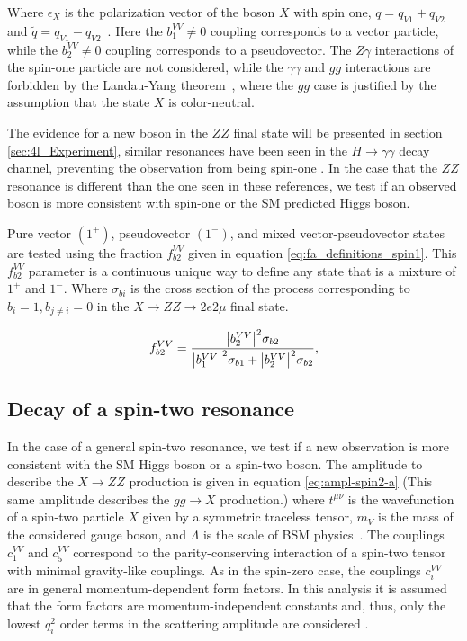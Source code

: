 Where $\epsilon_{X}$ is the polarization vector of the boson $X$ with spin one, ${q}=q_{V1}+q_{V2}$ and ${\tilde q}=q_{V1}-q_{V2}$~\cite{Gao:2010qx, Bolognesi:2012mm}. Here the $b_{1}^{VV}  \neq 0$ coupling corresponds to a vector particle, while the $b_{2}^{VV} \neq 0$ coupling corresponds to a pseudovector. The $Z\gamma$ interactions of the spin-one particle are not considered, while the $\gamma\gamma$  and $gg$ interactions are forbidden by the Landau-Yang theorem~\cite{Landau:1948kw, Yang:1950rg}, where the $gg$ case is justified by the assumption that the state $X$ is color-neutral.

The evidence for a new boson in the $ZZ$ final state will be presented in section \ref{sec:4l_Experiment}, similar resonances have been seen in the $H \to \gamma\gamma$ decay channel, preventing the observation from being spin-one \cite{Aad:2012tfa,Chatrchyan:2012ufa,Chatrchyan:2013lba}. In the case that the $ZZ$ resonance is different than the one seen in these references, we test if an observed boson is more consistent with spin-one or the SM predicted Higgs boson. 

Pure vector $\left(1^{+}\right)$, pseudovector $\left(1^{-}\right)$, and mixed vector-pseudovector states are tested using the fraction $f_{b2}^{VV}$ given in equation \eqref{eq:fa_definitions_spin1}. This $f_{b2}^{VV}$ parameter is a continuous unique way to define any state that is a mixture of $1^{+}$ and $1^{-}$. Where $\sigma_{bi}$ is the cross section of the process corresponding to $b_{i} = 1, b_{j\neq i} = 0$ in the $X \to ZZ \to 2e2\mu$ final state.

\begin{equation}
f_{b2}^{VV}  = \frac{\abs{b_{2}^{VV}}^2 \sigma_{b2}}{\abs{b_{1}^{VV}}^2 \sigma_{b1} + \abs{b_{2}^{VV}}^2 \sigma_{b2}},
\label{eq:fa_definitions_spin1}
\end{equation}

\subsection{Decay of a spin-two resonance}
\label{sec:Spin2_Pheno}

In the case of a general spin-two resonance, we test if a new observation is more consistent with the SM Higgs boson or a spin-two boson. The amplitude to describe the $X \to ZZ$ production is given in equation \eqref{eq:ampl-spin2-a} (This same amplitude describes the $gg \to X$ production.) where $t^{\mu\nu}$ is the wavefunction of a spin-two particle $X$ given by a symmetric traceless tensor, $m_{V}$ is the mass of the considered gauge boson, and $\Lambda$ is the scale of BSM physics~\cite{Gao:2010qx, Bolognesi:2012mm}. The couplings $c_{1}^{VV}$ and $c_{5}^{VV}$ correspond to the parity-conserving interaction of a spin-two tensor with minimal gravity-like couplings. As in the spin-zero case, the couplings $c_{i}^{VV}$ are in general momentum-dependent form factors. In this analysis it is assumed that the form factors are momentum-independent constants and, thus, only the lowest $q_i^2$  order terms in the scattering amplitude are considered \cite{Khachatryan:2014kca}.



